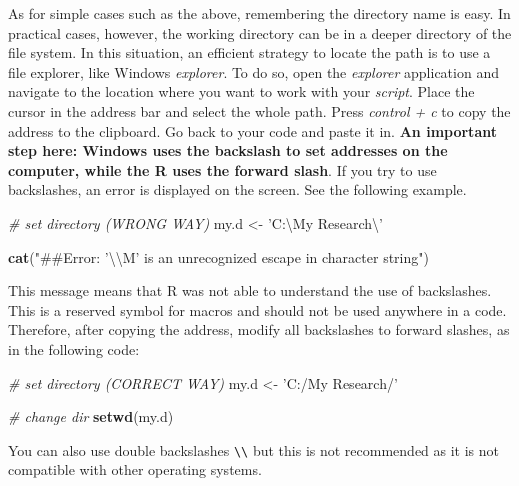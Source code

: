 \documentclass[11pt,]{book}
\newenvironment{Shaded}{\begin{snugshade}}{\end{snugshade}}
\newcommand{\KeywordTok}[1]{\textcolor[rgb]{0.27,0.27,0.27}{\textbf{#1}}}
\newcommand{\CharTok}[1]{\textcolor[rgb]{0.5,0.5,0.5}{#1}}
\newcommand{\StringTok}[1]{\textcolor[rgb]{0.5,0.5,0.5}{#1}}
\newcommand{\CommentTok}[1]{\textcolor[rgb]{0.56,0.35,0.01}{\textit{#1}}}
\newcommand{\NormalTok}[1]{#1}
\begin{document}
As for simple cases such as the above, remembering the directory name is
easy. In practical cases, however, the working directory can be in a
deeper directory of the file system. In this situation, an efficient
strategy to locate the path is to use a file explorer, like Windows
\emph{explorer}. To do so, open the \emph{explorer} application and
navigate to the location where you want to work with your \emph{script}.
Place the cursor in the address bar and select the whole path. Press
\emph{control + c} to copy the address to the clipboard. Go back to your
code and paste it in. \textbf{An important step here: Windows uses the
backslash to set addresses on the computer, while the R uses the forward
slash}. If you try to use backslashes, an error is displayed on the
screen. See the following example.

\begin{Shaded}
\begin{Highlighting}[]
\CommentTok{# set directory (WRONG WAY)}
\NormalTok{my.d <-}\StringTok{ 'C:\textbackslash{}My Research}\CharTok{\textbackslash{}'}
\end{Highlighting}
\end{Shaded}

\begin{Shaded}
\begin{Highlighting}[]
\KeywordTok{cat}\NormalTok{(}\StringTok{"##Error: '}\CharTok{\textbackslash{}\textbackslash{}}\StringTok{M' is an unrecognized escape in character string"}\NormalTok{)}
\end{Highlighting}
\end{Shaded}

This message means that R was not able to understand the use of
backslashes. This is a reserved symbol for macros and should not be used
anywhere in a code. Therefore, after copying the address, modify all
backslashes to forward slashes, as in the following code:

\begin{Shaded}
\begin{Highlighting}[]
\CommentTok{# set directory (CORRECT WAY)}
\NormalTok{my.d <-}\StringTok{ 'C:/My Research/'}

\CommentTok{# change dir}
\KeywordTok{setwd}\NormalTok{(my.d)}
\end{Highlighting}
\end{Shaded}

You can also use double backslashes
\texttt{\textbackslash{}\textbackslash{}} but this is not recommended as
it is not compatible with other operating systems.
\end{document}
